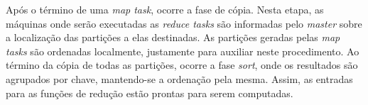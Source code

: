 Após o término de uma \textit{map task}, ocorre a fase de cópia. Nesta etapa, as máquinas onde serão executadas as \textit{reduce tasks} são informadas pelo \textit{master} sobre a localização das partições a elas destinadas. As partições geradas pelas \textit{map tasks} são ordenadas localmente, justamente para auxiliar neste procedimento. Ao término da cópia de todas as partições, ocorre a fase \textit{sort}, onde os resultados são agrupados por chave, mantendo-se a ordenação pela mesma. Assim, as entradas para as funções de redução estão prontas para serem computadas.


